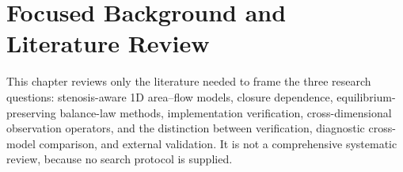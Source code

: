 \section{Focused Background and Literature Review}
\label{sec:background-literature-review}

This chapter reviews only the literature needed to frame the three research
questions: stenosis-aware 1D area--flow models, closure dependence,
equilibrium-preserving balance-law methods, implementation verification,
cross-dimensional observation operators, and the distinction between verification,
diagnostic cross-model comparison, and external validation. It is not a
comprehensive systematic review, because no search protocol is supplied.




